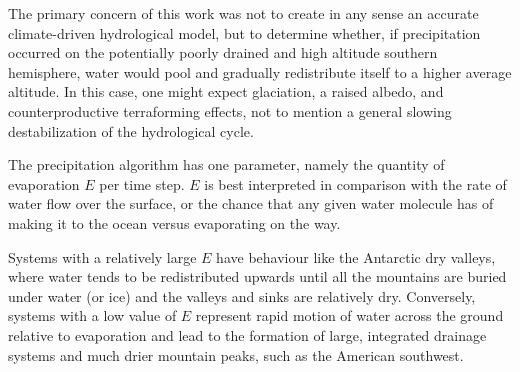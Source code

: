 \documentclass[12pt]{iopart}
\numberwithin{equation}{section}
\begin{document}
The primary concern of this work was not to create in any sense an accurate climate-driven hydrological model, but to determine whether, if precipitation occurred on the potentially poorly drained and high altitude southern hemisphere, water would pool and gradually redistribute itself to a higher average altitude. In this case, one might expect glaciation, a raised albedo, and counterproductive terraforming effects, not to mention a general slowing destabilization of the hydrological cycle. 

The precipitation algorithm has one parameter, namely the quantity of evaporation $E$ per time step. $E$ is best interpreted in comparison with the rate of water flow over the surface, or the chance that any given water molecule has of making it to the ocean versus evaporating on the way. 

Systems with a relatively large $E$ have behaviour like the Antarctic dry valleys\cite{dryvalleys}, where water tends to be redistributed upwards until all the mountains are buried under water (or ice) and the valleys and sinks are relatively dry. Conversely, systems with a low value of $E$ represent rapid motion of water across the ground relative to evaporation and lead to the formation of large, integrated drainage systems and much drier mountain peaks, such as the American southwest\cite{amsouthwest}.
\end{document}
